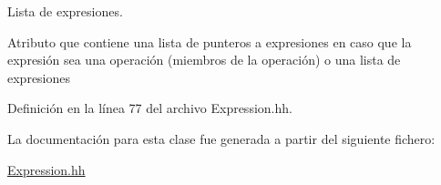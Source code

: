 Lista de expresiones. 

Atributo que contiene una lista de punteros a expresiones en caso que la expresión sea una operación (miembros de la operación) o una lista de expresiones 

Definición en la línea 77 del archivo Expression.\+hh.



La documentación para esta clase fue generada a partir del siguiente fichero\+:\begin{DoxyCompactItemize}
\item 
\hyperlink{_expression_8hh}{Expression.\+hh}\end{DoxyCompactItemize}
